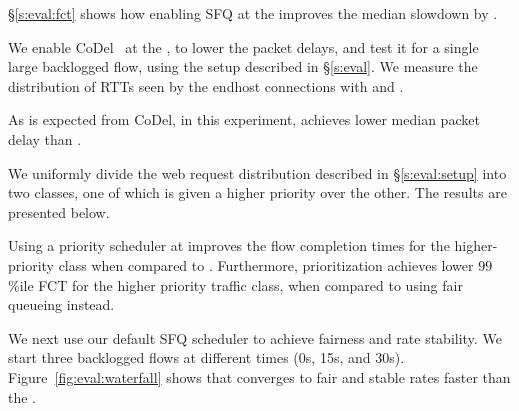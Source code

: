 \S\ref{s:eval:fct} shows how enabling SFQ at the \name improves the median slowdown by \overviewBenefitsBundlerMedianImprovement.

We enable CoDel~\cite{fq-codel} at the \inbox, to lower the packet delays, and test it for a single large backlogged flow, using the setup described in \S\ref{s:eval}.
We measure the distribution of RTTs seen by the endhost connections with \name and \baseline.

As is expected from CoDel, \name in this experiment, achieves \delaysImprovement lower median packet delay than \baseline.

\label{s:eval:strictprio}
We uniformly divide the web request distribution described in \S\ref{s:eval:setup} into two classes, one of which is given a higher priority over the other. The results are presented below.

Using a priority scheduler at \inbox improves the flow completion times for the higher-priority class when compared to \baseline.
Furthermore, prioritization achieves \strictPrioTailImprovementOverFq lower $99$\%ile FCT for the higher priority traffic class, when compared to using fair queueing instead.


\label{s:eval:waterfall}
We next use our default SFQ scheduler to achieve fairness and rate stability. We start three backlogged flows at different times (0s, 15s, and 30s). Figure~\ref{fig:eval:waterfall} shows that \name converges to fair and stable rates faster than the \baseline.



